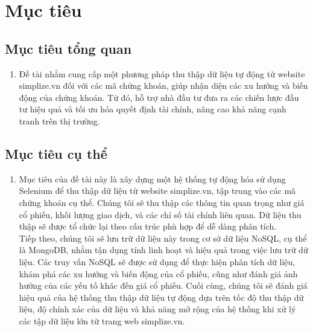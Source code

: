 \section{Mục tiêu}
\subsection{Mục tiêu tổng quan}
\begin{enumerate}
	\item[]
       \hspace*{0.7cm}Đề tài nhằm cung cấp một phương pháp thu thập dữ liệu tự động từ website simplize.vn đối với các mã chứng khoán, giúp nhận diện các xu hướng và biến động của chứng khoán. Từ đó, hỗ trợ nhà đầu tư đưa ra các chiến lược đầu tư hiệu quả và tối ưu hóa quyết định tài chính, nâng cao khả năng cạnh tranh trên thị trường.
\end{enumerate}

\subsection{Mục tiêu cụ thể}
\begin{enumerate}
    \item []
        \hspace*{0.7cm}Mục tiêu của đề tài này là xây dựng một hệ thống tự động hóa sử dụng Selenium để thu thập dữ liệu từ website simplize.vn, tập trung vào các mã chứng khoán cụ thể. Chúng tôi sẽ thu thập các thông tin quan trọng như giá cổ phiếu, khối lượng giao dịch, và các chỉ số tài chính liên quan. Dữ liệu thu thập sẽ được tổ chức lại theo cấu trúc phù hợp để dễ dàng phân tích.\\

        \hspace*{0.7cm} Tiếp theo, chúng tôi sẽ lưu trữ dữ liệu này trong cơ sở dữ liệu NoSQL, cụ thể là MongoDB, nhằm tận dụng tính linh hoạt và hiệu quả trong việc lưu trữ dữ liệu. Các truy vấn NoSQL sẽ được sử dụng để thực hiện phân tích dữ liệu, khám phá các xu hướng và biến động của cổ phiếu, cũng như đánh giá ảnh hưởng của các yếu tố khác đến giá cổ phiếu. Cuối cùng, chúng tôi sẽ đánh giá hiệu quả của hệ thống thu thập dữ liệu tự động dựa trên tốc độ thu thập dữ liệu, độ chính xác của dữ liệu và khả năng mở rộng của hệ thống khi xử lý các tập dữ liệu lớn từ trang web simplize.vn.
\end{enumerate}